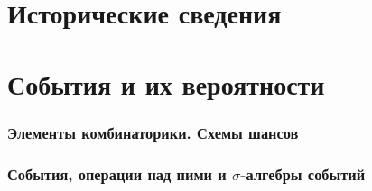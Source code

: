 
\usepackage{setspace}
\usepackage{amsmath, amssymb}
\newcommand{\noo}{\varnothing}
\usepackage{amsthm}
\DeclareMathOperator{\sinc}{sinc}

\newtheorem{mydef}{Определение}[section]

\newtheorem{theorem}{Теорема}[section]

\newtheorem{lemma}[theorem]{Лемма}%

\theoremstyle{definition}
\newtheorem{consq}[theorem]{Следствие}%
\newtheorem{definition}[theorem]{Определение}%
\newtheorem{deflemma}[theorem]{Лемма-определение}%
\newtheorem{zam}[theorem]{Замечание}

\theoremstyle{remark}
\newtheorem{remark}[theorem]{Замечание}%






\def\labauthors{}
\def\labgroup{}
\def\labnumber{}
\def\labtheme{}
\renewcommand{\vec}{\mathbf}
\renewcommand{\Re}{\operatorname{Re}}
\renewcommand{\Im}{\operatorname{Im}}
\renewcommand{\phi}{\varphi}
\renewcommand{\kappa}{\varkappa}
\renewcommand{\hat}{\widehat}

\begin{spacing}{1}
\tableofcontents
\end{spacing}
\newpage
\part*{Исторические сведения}


\part{События и их вероятности}
\section{Элементы комбинаторики. Схемы шансов} %
% 

\section{События, операции над ними и $\sigma$-алгебры событий} %
% 

